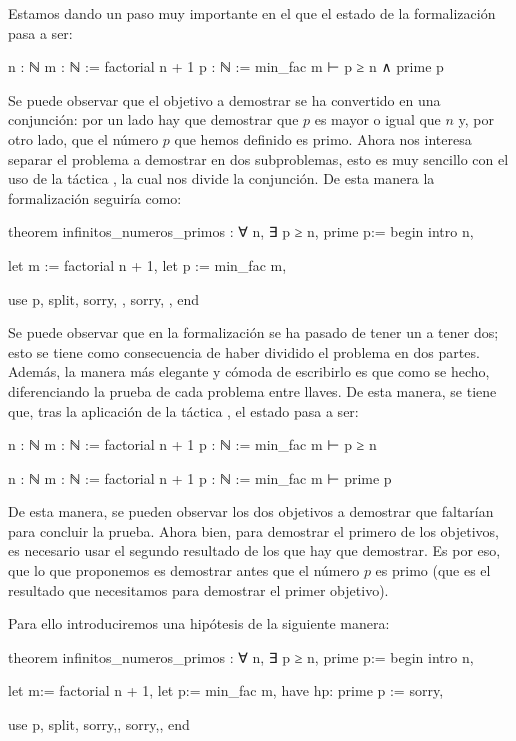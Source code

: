 Estamos dando un paso muy importante en el que el estado de la formalización
pasa a ser:
\begin{leancode}
n : ℕ
m : ℕ := factorial n + 1
p : ℕ := min_fac m
⊢ p ≥ n ∧ prime p
\end{leancode}

Se puede observar que el objetivo a demostrar se ha convertido en una
conjunción: por un lado hay que demostrar que \(p\) es mayor o igual que
\(n\) y, por otro lado, que el número \(p\) que hemos definido es primo. Ahora
nos interesa separar el problema a demostrar en dos subproblemas, esto es
muy sencillo con el uso de la táctica , la cual nos
divide la conjunción. De esta manera la formalización seguiría como:
\begin{leancode}
theorem infinitos_numeros_primos : ∀ n, ∃ p ≥ n, prime p:=
begin
  intro n,

  let m := factorial n + 1,
  let p := min_fac m,

  use p,
  split,
  { sorry, },
  { sorry, },
end
\end{leancode}

Se puede observar que en la formalización se ha pasado de tener un
 a tener dos; esto se tiene como consecuencia de
haber dividido el problema en dos partes. Además, la manera más elegante
y cómoda de escribirlo es que como se hecho, diferenciando la prueba de
cada problema entre llaves. De esta manera, se tiene que, tras la
aplicación de la táctica , el estado pasa a ser:
\begin{leancode}
n : ℕ
m : ℕ := factorial n + 1
p : ℕ := min_fac m
⊢ p ≥ n

n : ℕ
m : ℕ := factorial n + 1
p : ℕ := min_fac m
⊢ prime p
\end{leancode}

De esta manera, se pueden observar los dos objetivos a demostrar que faltarían
para concluir la prueba. Ahora bien, para demostrar el primero de los objetivos,
es necesario usar el segundo resultado de los que hay que demostrar. Es por eso,
que lo que proponemos es demostrar antes que el número \(p\) es primo (que es
el resultado que necesitamos para demostrar el primer objetivo).

Para ello introduciremos una hipótesis de la siguiente manera:

\begin{leancode}
theorem infinitos_numeros_primos : ∀ n, ∃ p ≥ n, prime p:=
begin
  intro n,

  let m:= factorial n + 1,
  let p:= min_fac m,
  have hp: prime p := sorry,

  use p,
  split,
  {sorry,},
  {sorry,},
end
\end{leancode}

